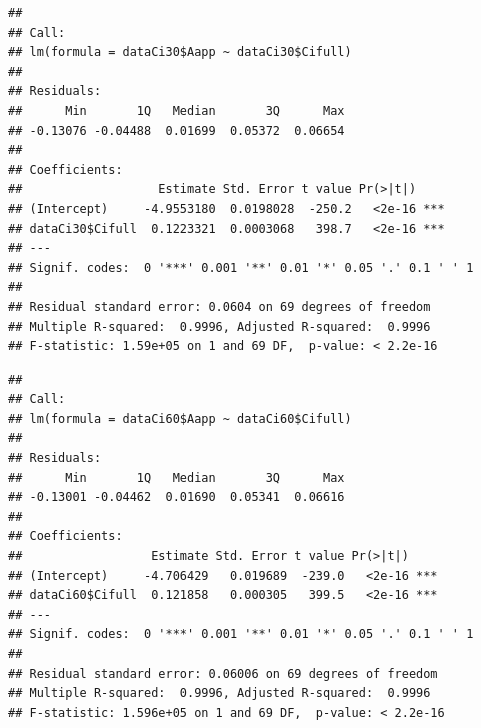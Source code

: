 \documentclass[
]{krantz}
\makeatletter
\newenvironment{Shaded}{\begin{snugshade}}{\end{snugshade}}
\newcommand{\DecValTok}[1]{\textcolor[rgb]{0.00,0.00,0.81}{#1}}
\newcommand{\KeywordTok}[1]{\textcolor[rgb]{0.13,0.29,0.53}{\textbf{#1}}}
\newcommand{\NormalTok}[1]{#1}
\newcommand{\OperatorTok}[1]{\textcolor[rgb]{0.81,0.36,0.00}{\textbf{#1}}}
\newcommand{\StringTok}[1]{\textcolor[rgb]{0.31,0.60,0.02}{#1}}
\newenvironment{kframe}{%
\medskip{}
\setlength{\fboxsep}{.8em}
 \def\at@end@of@kframe{}%
 \ifinner\ifhmode%
  \def\at@end@of@kframe{\end{minipage}}%
  \begin{minipage}{\columnwidth}%
 \fi\fi%
 \def\FrameCommand##1{\hskip\@totalleftmargin \hskip-\fboxsep
 \colorbox{shadecolor}{##1}\hskip-\fboxsep
     \hskip-\linewidth \hskip-\@totalleftmargin \hskip\columnwidth}%
 \MakeFramed {\advance\hsize-\width
   \@totalleftmargin\z@ \linewidth\hsize
   \@setminipage}}%
 {\par\unskip\endMakeFramed%
 \at@end@of@kframe}
\renewenvironment{Shaded}{\begin{kframe}}{\end{kframe}}
\makeatother
\begin{document}
\begin{verbatim}
## 
## Call:
## lm(formula = dataCi30$Aapp ~ dataCi30$Cifull)
## 
## Residuals:
##      Min       1Q   Median       3Q      Max 
## -0.13076 -0.04488  0.01699  0.05372  0.06654 
## 
## Coefficients:
##                   Estimate Std. Error t value Pr(>|t|)    
## (Intercept)     -4.9553180  0.0198028  -250.2   <2e-16 ***
## dataCi30$Cifull  0.1223321  0.0003068   398.7   <2e-16 ***
## ---
## Signif. codes:  0 '***' 0.001 '**' 0.01 '*' 0.05 '.' 0.1 ' ' 1
## 
## Residual standard error: 0.0604 on 69 degrees of freedom
## Multiple R-squared:  0.9996, Adjusted R-squared:  0.9996 
## F-statistic: 1.59e+05 on 1 and 69 DF,  p-value: < 2.2e-16
\end{verbatim}

\begin{Shaded}
\end{Shaded}

\begin{verbatim}
## 
## Call:
## lm(formula = dataCi60$Aapp ~ dataCi60$Cifull)
## 
## Residuals:
##      Min       1Q   Median       3Q      Max 
## -0.13001 -0.04462  0.01690  0.05341  0.06616 
## 
## Coefficients:
##                  Estimate Std. Error t value Pr(>|t|)    
## (Intercept)     -4.706429   0.019689  -239.0   <2e-16 ***
## dataCi60$Cifull  0.121858   0.000305   399.5   <2e-16 ***
## ---
## Signif. codes:  0 '***' 0.001 '**' 0.01 '*' 0.05 '.' 0.1 ' ' 1
## 
## Residual standard error: 0.06006 on 69 degrees of freedom
## Multiple R-squared:  0.9996, Adjusted R-squared:  0.9996 
## F-statistic: 1.596e+05 on 1 and 69 DF,  p-value: < 2.2e-16
\end{verbatim}

\begin{Shaded}
\end{Shaded}
\end{document}
